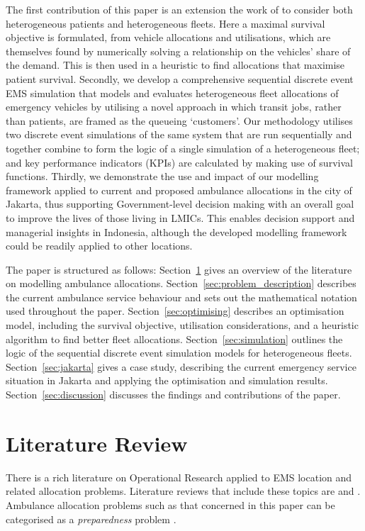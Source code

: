 \documentclass[preprint,12pt]{elsarticle}
\begin{document}
The first contribution of this paper is an extension the work of
\cite{Knight2012918} to consider both heterogeneous patients and heterogeneous
fleets. Here a maximal survival objective is formulated, from vehicle
allocations and utilisations, which are themselves found by numerically
solving a relationship on the vehicles' share of the demand. This is then used
in a heuristic to find allocations that maximise patient survival.
Secondly, we develop a comprehensive sequential discrete event EMS
simulation that models and evaluates heterogeneous fleet allocations of
emergency vehicles by utilising a novel approach in which transit jobs, rather
than patients, are framed as the queueing `customers'. Our methodology
utilises two discrete event simulations of the same system that are run
sequentially and together combine to form the logic of a single simulation of
a heterogeneous fleet; and key performance indicators (KPIs) are calculated by
making use of survival functions.
Thirdly, we demonstrate the use and impact of our modelling framework applied
to current and proposed ambulance allocations in the city of Jakarta, thus
supporting Government-level decision making with an overall goal to improve
the lives of those living in LMICs. This enables decision support and
managerial insights in Indonesia, although the developed modelling framework
could be readily applied to other locations.

The paper is structured as follows:
Section~\ref{sec:litreview} gives an overview of the literature on modelling
ambulance allocations.
Section~\ref{sec:problem_description} describes the current ambulance service
behaviour and sets out the mathematical notation used throughout the paper.
Section~\ref{sec:optimising} describes an
optimisation model, including the survival objective, utilisation
considerations, and a heuristic algorithm to find better fleet allocations.
Section~\ref{sec:simulation} outlines the logic of the sequential discrete
event simulation models for heterogeneous fleets.
Section~\ref{sec:jakarta} gives a case study, describing the current emergency
service situation in Jakarta and applying the optimisation and simulation
results.
Section~\ref{sec:discussion} discusses the findings and contributions of the
paper.



\section{Literature Review}\label{sec:litreview}
There is a rich literature on Operational Research applied to EMS location and
related allocation problems. Literature reviews that include these topics are
\citet{aringhieri2017emergency, belanger2019recent, farahani2019or, Li2011, Liu2021, reuter2017logistics, mukhopadhyay22}
and \citet{wang2021emergency}. Ambulance allocation problems such as that
concerned in this paper can be categorised as a \textit{preparedness}
problem \citep{mukhopadhyay22}.
\end{document}

